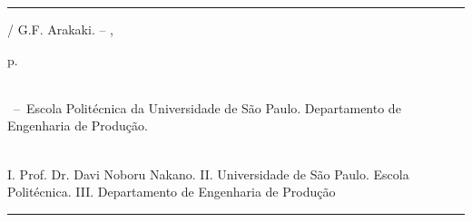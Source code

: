 \begin{fichacatalografica}\label{ficha catalografica}
	\vspace*{\fill}					%
	\hrule							%
	\begin{center}					%
	\begin{minipage}[c]{12.5cm}		%
	
	\imprimirautor
	
	\hspace{0.5cm} \imprimirtitulo  / G.F. Arakaki. --
	\imprimirlocal, \imprimirdata
	
	\hspace{0.5cm} \pageref{LastPage} p.\\
	
	\hspace{0.5cm} \imprimirorientadorRotulo~\imprimirorientador\\
	
	\hspace{0.5cm}
	\parbox[t]{\textwidth}{\imprimirtipotrabalho~--~Escola Politécnica da Universidade de São Paulo. Departamento de Engenharia de Produção.}\\
	
	\hspace{0.5cm}
		I. Prof. Dr. Davi Noboru Nakano.
		II. Universidade de São Paulo. Escola Politécnica.
		III. Departamento de Engenharia de Produção\\ 
	
	
	\end{minipage}
	\end{center}
	\hrule
\end{fichacatalografica}